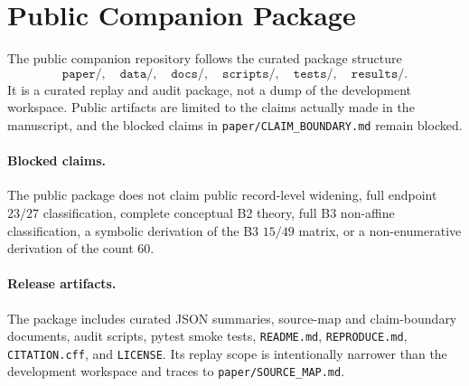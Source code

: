 \section{Public Companion Package}

The public companion repository follows the curated package structure
\[
\texttt{paper/},\quad \texttt{data/},\quad \texttt{docs/},\quad
\texttt{scripts/},\quad \texttt{tests/},\quad \texttt{results/}.
\]
It is a curated replay and audit package, not a dump of the development
workspace.  Public artifacts are limited to the claims actually made in the
manuscript, and the blocked claims in \texttt{paper/CLAIM\_BOUNDARY.md} remain
blocked.

\paragraph{Blocked claims.}
The public package does not claim public record-level widening, full endpoint
\(23/27\) classification, complete conceptual B2 theory, full B3 non-affine
classification, a symbolic derivation of the B3 \(15/49\) matrix, or a
non-enumerative derivation of the count \(60\).

\paragraph{Release artifacts.}
The package includes curated JSON summaries, source-map and claim-boundary
documents, audit scripts, pytest smoke tests, \texttt{README.md},
\texttt{REPRODUCE.md}, \texttt{CITATION.cff}, and \texttt{LICENSE}.  Its replay
scope is intentionally narrower than the development workspace and traces to
\texttt{paper/SOURCE\_MAP.md}.